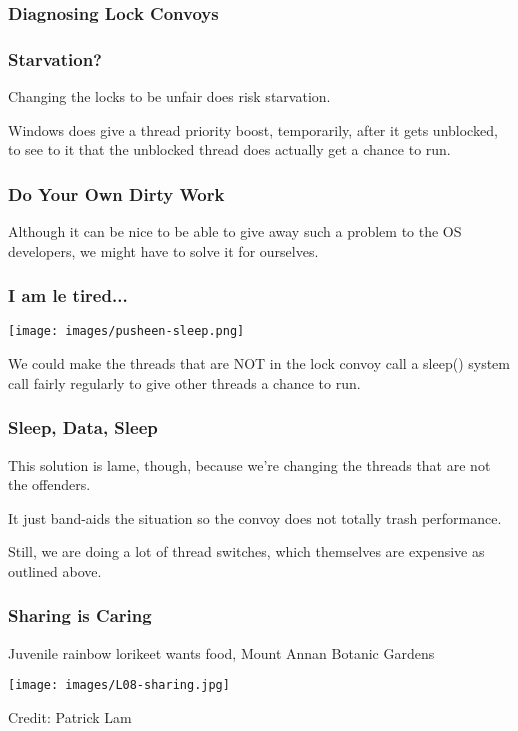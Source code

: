 \begin{frame}
\frametitle{Diagnosing Lock Convoys}

\begin{center}

\end{center}

\end{frame}

\begin{frame}
\frametitle{Starvation?}

Changing the locks to be unfair does risk starvation. 

Windows does give a thread priority boost, temporarily, after it gets unblocked, to see to it that the unblocked thread does actually get a chance to run.

\end{frame}

\begin{frame}
\frametitle{Do Your Own Dirty Work}

Although it can be nice to be able to give away such a problem to the OS developers, we might have to solve it for ourselves. 


\end{frame}
 

\begin{frame}
\frametitle{I am le tired...}

\begin{center}
	\texttt{[image: images/pusheen-sleep.png]}
\end{center}

We could make the threads that are NOT in the lock convoy call a sleep() system call fairly regularly to give other threads a chance to run. 


\end{frame}


\begin{frame}
\frametitle{Sleep, Data, Sleep}

This solution is lame, though, because we're changing the threads that are not the offenders.

It just band-aids the situation so the convoy does not totally trash performance. 

Still, we are doing a lot of thread switches, which themselves are expensive as outlined above.

\end{frame}

\begin{frame}
\frametitle{Sharing is Caring}

\begin{center}
Juvenile rainbow lorikeet wants food, Mount Annan Botanic Gardens

\texttt{[image: images/L08-sharing.jpg]}

Credit: Patrick Lam
\end{center}

\end{frame}

